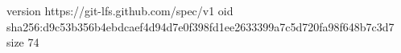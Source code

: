 version https://git-lfs.github.com/spec/v1
oid sha256:d9c53b356b4ebdcaef4d94d7e0f398fd1ee2633399a7c5d720fa98f648b7c3d7
size 74
